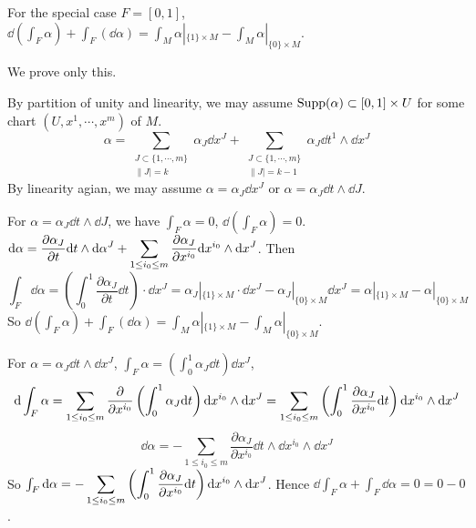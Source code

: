 For the special case  $ F=[0,1] $,  $ \dd\left(\int_F\alpha\right)+\int_F(\dd\alpha)=\int_M\alpha|_{\{1\}\times M}-\int_M\alpha|_{\{0\}\times M} $.

We  prove only this.

By partition of unity and linearity, we may assume  $ \mathrm{Supp}(\alpha)\subset[0,1]\times U $ for some chart  $ (U,x^1,\cdots,x^m) $ of  $ M $.
\begin{equation}
    \alpha=\sum_{\substack{J\subset\{1,\cdots,m\}\\\|J|=k}}\alpha_J \dd x^J+\sum_{\substack{J\subset\{1,\cdots,m\}\\\|J|=k-1}}\alpha_J\dd t^1\wedge\dd x^J
\end{equation}   
By linearity agian, we may assume  $ \alpha=\alpha_J\dd x^J $ or  $ \alpha=\alpha_J\dd t\wedge\dd J $.

For  $ \alpha=\alpha_J\dd t\wedge\dd J $, we have  $ \int_F\alpha=0 $,  $ \dd\left(\int_F\alpha \right)=0 $.  $ \mathrm{d}\alpha=\displaystyle\frac{\partial \alpha_J}{\partial t}\mathrm{d} t\wedge\mathrm{d} \alpha^J+\sum_{1 \leq i_0\leq m}\frac{\partial \alpha_J}{\partial x^{i_0}}\mathrm{d} x^{i_0}\wedge\mathrm{d} x^J $.
Then 
\begin{equation}
    \int_F\dd\alpha=\left(\int_0^1 \frac{\partial \alpha_J}{\partial t}\dd t\right)\cdot \dd x^J=\alpha_J|_{\{1\}\times M}\cdot \dd x^J-\alpha_J|_{\{0\}\times M}\dd x^J=\alpha|_{\{1\}\times M}-\alpha|_{\{0\}\times M}
\end{equation}
So  $  \dd\left(\int_F\alpha\right)+\int_F(\dd\alpha)=\int_M\alpha|_{\{1\}\times M}-\int_M\alpha|_{\{0\}\times M} $.

For $ \alpha=\alpha_J\dd t\wedge\dd x^J $,  $ \int_F\alpha=\left(\int_0^1\alpha_J\dd t \right)\dd x^J $,  
\begin{equation}
    \mathrm{d} \int_F\alpha=\displaystyle\sum_{1 \leq i_0 \leq m}\frac{\partial}{\partial x^{i_0}}\left(\int_0^1\alpha_J\mathrm{d} t\right)\mathrm{d} x^{i_0}\wedge\mathrm{d} x^J=\sum_{1 \leq i_0 \leq m}\left(\int_0^1\frac{\partial \alpha_J}{\partial x^{i_0}}\mathrm{d} t\right)\mathrm{d} x^{i_0}\wedge\mathrm{d} x^J 
\end{equation}
\begin{equation}
    \dd \alpha=-\sum_{1 \leq i_0 \leq m}\frac{\partial \alpha_J}{\partial x^{i_0}}\dd t\wedge\dd x^{i_0}\wedge\dd x^J
\end{equation}
So  $ \int_F\mathrm{d}\alpha =-\displaystyle\sum_{1 \leq i_0 \leq m}\left(\int_0^1\frac{\partial \alpha_J}{\partial x^{i_0}}\mathrm{d} t\right)\mathrm{d} x^{i_0}\wedge\mathrm{d} x^J $. Hence  $ \dd\int_F\alpha+\int_F\dd\alpha=0=0-0 $.

